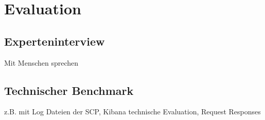 \section{Evaluation}

\subsection{Experteninterview}
Mit Menschen sprechen

\subsection{Technischer Benchmark}
z.B. mit Log Dateien der SCP, Kibana technische Evaluation, Request Responses

\newpage